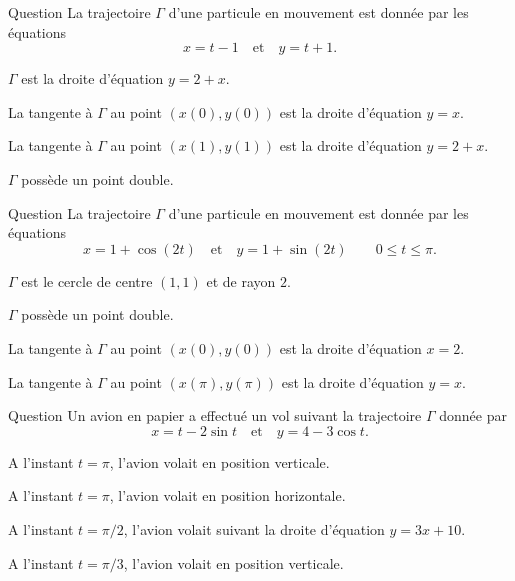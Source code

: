 

\begin{multi}[multiple,feedback=
{En éliminant le paramètre \(t\), on obtient \(y=2+x\). \(\Gamma\) est la droite d'équation \(y=2+x\) et elle est confondue avec sa tangente en n'importe quel point.
}]{Question}
La trajectoire \(\Gamma\) d'une particule en mouvement est donnée par les équations
\[x=t-1\quad \mbox{et} \quad y=t+1.\]

    \item* \(\Gamma\) est la droite d'équation \(y=2+x\).
    \item La tangente à \(\Gamma\) au point \((x(0),y(0))\) est la droite d'équation \(y=x\).
    \item* La tangente à \(\Gamma\) au point \((x(1),y(1))\) est la droite d'équation \(y=2+x\).
    \item \(\Gamma\) possède un point double.
\end{multi}


\begin{multi}[multiple,feedback=
{En éliminant le paramètre \(t\), on obtient : \((x-1)^2+(y-1)^2=1\). Donc \(\Gamma\) est le cercle de centre \((1,1)\) et de rayon \(1\). Les points de paramètres \(0\) et \(\pi\) sont confondus. Enfin, \(x'(0)=0\) et \(y'(0)\neq 0\), donc la tangente au point \((x(0),y(0))\) est la droite d'équation \(x=x(0)\).
}]{Question}
La trajectoire \(\Gamma\) d'une particule en mouvement est donnée par les équations
\[x=1+\cos (2t)\quad \mbox{et} \quad y=1+\sin (2t)\qquad 0\leq t\leq \pi.\]

    \item \(\Gamma\) est le cercle de centre \((1,1)\) et de rayon \(2\).
    \item* \(\Gamma\) possède un point double.
    \item* La tangente à \(\Gamma\) au point \((x(0),y(0))\) est la droite d'équation \(x=2\).
    \item La tangente à \(\Gamma\) au point \((x(\pi),y(\pi))\) est la droite d'équation \(y=x\).
\end{multi}


\begin{multi}[multiple,feedback=
{On a : \(y'(\pi)=0\) et \(x'(\pi)\neq 0\). Donc la tangente au point de paramètre \(\pi\) est horizontale. A l'instant \(t=\pi/2\), l'avion volait suivant la tangente \`a \(\Gamma\) à cet instant. C'est-à-dire suivant la droite d'équation \(y=3x+10-3\pi /2\). Enfin, \(x'(\pi/3)=0\) et \(y'(\pi/3)\neq 0\). Donc la tangente au point de paramètre \(\pi/3\) est verticale.
}]{Question}
Un avion en papier a effectué un vol suivant la trajectoire \(\Gamma\) donnée par
\[x=t-2\sin t\quad \mbox{et} \quad y=4-3\cos t.\]

    \item A l'instant \(t=\pi\), l'avion volait en position verticale.
    \item* A l'instant \(t=\pi\), l'avion volait en position horizontale.
    \item A l'instant \(t=\pi/2\), l'avion volait suivant la droite d'équation \(y=3x+10\).
    \item* A l'instant \(t=\pi/3\), l'avion volait en position verticale.
\end{multi}


